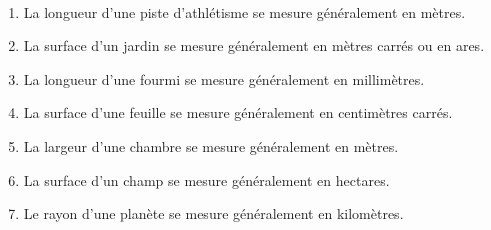 \ \\ [-5mm]
   \begin{enumerate}
      \item La longueur d'une piste d'athlétisme se mesure généralement en {\blue mètres}.
      \item La surface d'un jardin  se mesure généralement en {\blue mètres carrés} ou en {\blue ares}.
      \item La longueur d'une fourmi se mesure généralement en {\blue millimètres}.
      \item La surface d'une feuille se mesure généralement en {\blue centimètres carrés}.
      \item La largeur d'une chambre se mesure généralement en {\blue mètres}.
      \item La surface d'un champ se mesure généralement en {\blue hectares}.
      \item Le rayon d'une planète se mesure généralement en {\blue kilomètres}.
   \end{enumerate}
